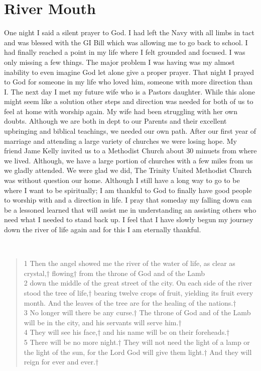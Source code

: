\documentclass[11pt,a4paper]{scrartcl} %
\begin{document}
\section{River Mouth}
\begin{doublespace}
One night I said a silent prayer to God. I had left the Navy with all limbs in tact and was blessed with the GI Bill which was allowing me to go back to school. I had finally reached a point in my life where I felt grounded and focused. I was only missing a few things. The major problem I was having was my almost inability to even imagine God let alone give a proper prayer. That night I prayed to God for someone in my life who loved him, someone with more direction than I. The next day I met my future wife who is a Pastors daughter. While this alone might seem like a solution other steps and direction was needed for both of us to feel at home with worship again. My wife had been struggling with her own doubts. Although we are both in dept to our Parents and their excellent upbringing and biblical teachings, we needed our own path. After our first year of marriage and attending a large variety of churches we were losing hope. My friend Jame Kelly invited us to a Methodist Church about 30 minuets from where we lived. Although, we have a large portion of churches with a few miles from us we gladly attended. We were glad we did, The Trinity United Methodist Church was without question our home.  Although I still have a long way to go to be where I want to be spiritually; I am thankful to God to finally have good people to worship with and a direction in life. I pray that someday my falling down can be a lessoned learned that will assist me in understanding an assisting others who need what I needed to stand back up. I feel that I have slowly begun my journey down the river of life again and for this I am eternally thankful. 
\end{doublespace}
\clearpage
\textcolor{Sepia}{}\\
\begin{verse}
1 Then the angel showed me the river of the water of life, as clear as crystal,† flowing† from the throne of God and of the Lamb\\ 
2 down the middle of the great street of the city. On each side of the river stood the tree of life,† bearing twelve crops of fruit, yielding its fruit every month. And the leaves of the tree are for the healing of the nations.† \\
3 No longer will there be any curse.† The throne of God and of the Lamb will be in the city, and his servants will serve him.† \\
4 They will see his face,† and his name will be on their foreheads.† \\
5 There will be no more night.† They will not need the light of a lamp or the light of the sun, for the Lord God will give them light.† And they will reign for ever and ever.† 
\end{verse}
\clearpage
    \nocite{*}
    
    
\end{document}
